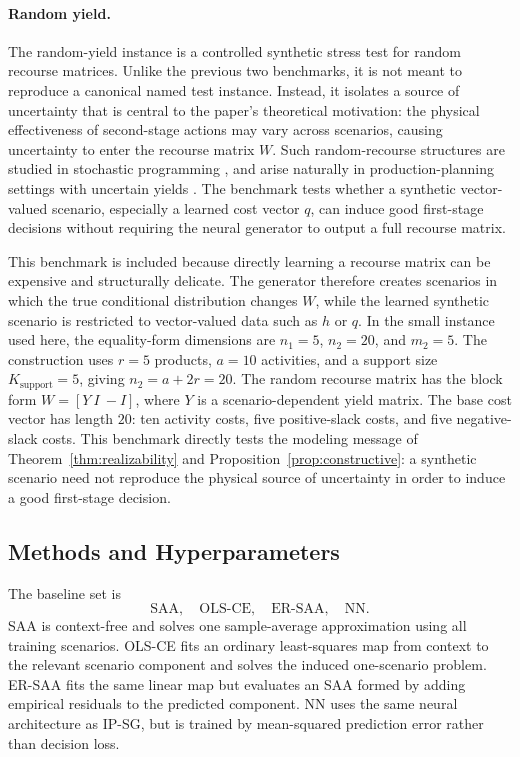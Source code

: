 \documentclass{article}
\newcommand{\1}{\mathbf{1}}
\theoremstyle{plain}
\theoremstyle{definition}
\theoremstyle{remark}
\begin{document}
\paragraph{Random yield.}
The random-yield instance is a controlled synthetic stress test for random recourse matrices. Unlike the previous two benchmarks, it is not meant to reproduce a canonical named test instance. Instead, it isolates a source of uncertainty that is central to the paper's theoretical motivation: the physical effectiveness of second-stage actions may vary across scenarios, causing uncertainty to enter the recourse matrix $W$. Such random-recourse structures are studied in stochastic programming \citep{fan2024decision,jiang2019quantitative}, and arise naturally in production-planning settings with uncertain yields \citep{kazemi2011production}. The benchmark tests whether a synthetic vector-valued scenario, especially a learned cost vector $q$, can induce good first-stage decisions without requiring the neural generator to output a full recourse matrix.

This benchmark is included because directly learning a recourse matrix can be expensive and structurally delicate. The generator therefore creates scenarios in which the true conditional distribution changes $W$, while the learned synthetic scenario is restricted to vector-valued data such as $h$ or $q$. In the small instance used here, the equality-form dimensions are $n_1=5$, $n_2=20$, and $m_2=5$. The construction uses $r=5$ products, $a=10$ activities, and a support size $K_{\mathrm{support}}=5$, giving $n_2=a+2r=20$. The random recourse matrix has the block form $W=[Y\ I\ -I]$, where $Y$ is a scenario-dependent yield matrix. The base cost vector has length $20$: ten activity costs, five positive-slack costs, and five negative-slack costs. This benchmark directly tests the modeling message of Theorem~\ref{thm:realizability} and Proposition~\ref{prop:constructive}: a synthetic scenario need not reproduce the physical source of uncertainty in order to induce a good first-stage decision.

\subsection{Methods and Hyperparameters}

The baseline set is
\[
\text{SAA},\quad
\text{OLS-CE},\quad
\text{ER-SAA},\quad
\text{NN}.
\]
SAA is context-free and solves one sample-average approximation using all training scenarios. OLS-CE fits an ordinary least-squares map from context to the relevant scenario component and solves the induced one-scenario problem. ER-SAA fits the same linear map but evaluates an SAA formed by adding empirical residuals to the predicted component. NN uses the same neural architecture as IP-SG, but is trained by mean-squared prediction error rather than decision loss.
\end{document}
